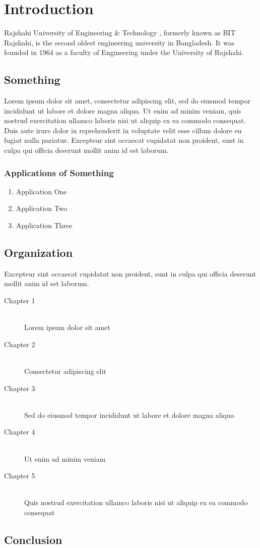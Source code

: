 \chapter{Introduction}
\noindent Rajshahi University of Engineering \& Technology \cite{ruetwebsite}, formerly known as BIT Rajshahi, is the second oldest engineering university in Bangladesh. It was founded in 1964 as a faculty of Engineering under the University of Rajshahi.

\section{Something}
\noindent Lorem ipsum \cite{awesome2016} dolor sit amet, consectetur adipiscing elit, sed do eiusmod tempor incididunt ut labore et dolore magna aliqua. Ut enim ad minim veniam, quis nostrud exercitation ullamco laboris nisi ut aliquip ex ea commodo consequat. Duis aute irure dolor in reprehenderit in voluptate velit esse cillum dolore eu fugiat nulla pariatur. Excepteur sint occaecat cupidatat non proident, sunt in culpa qui officia deserunt mollit anim id est laborum.

\subsection{Applications of Something}

\begin{enumerate}
        \item Application One
        \item Application Two
        \item Application Three
\end{enumerate}

\section{Organization}
Excepteur sint occaecat cupidatat non proident, sunt in culpa qui officia deserunt mollit anim id est laborum.

\begin{description}
        \item[Chapter 1] \hfill \\
        Lorem ipsum dolor sit amet
        \item[Chapter 2] \hfill \\
        Consectetur adipiscing elit
        \item[Chapter 3] \hfill \\
        Sed do eiusmod tempor incididunt ut labore et dolore magna aliqua
        \item[Chapter 4] \hfill \\
        Ut enim ad minim veniam
        \item[Chapter 5] \hfill \\
        Quis nostrud exercitation ullamco laboris nisi ut aliquip ex ea commodo consequat
\end{description}

\section*{Conclusion}
\lipsum[1]